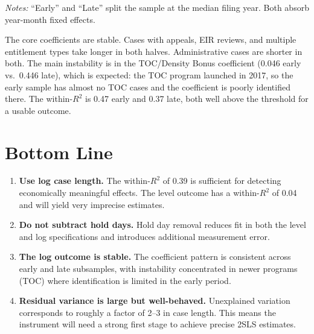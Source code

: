\documentclass[12pt]{article}
\theoremstyle{definition}
\begin{document}
\begin{table}[H]
\centering
\caption{Split-Sample Stability: Log Case Length}
\label{tab:split}

\begin{tablenotes}[flushleft]\small
\item \textit{Notes:} ``Early'' and ``Late'' split the sample at the median filing year. Both absorb year-month fixed effects.
\end{tablenotes}
\end{table}

The core coefficients are stable. Cases with appeals, EIR reviews, and multiple entitlement types take longer in both halves. Administrative cases are shorter in both. The main instability is in the TOC/Density Bonus coefficient (0.046 early vs.\ 0.446 late), which is expected: the TOC program launched in 2017, so the early sample has almost no TOC cases and the coefficient is poorly identified there. The within-$R^2$ is 0.47 early and 0.37 late, both well above the threshold for a usable outcome.

\section{Bottom Line}

\begin{enumerate}
    \item \textbf{Use log case length.} The within-$R^2$ of 0.39 is sufficient for detecting economically meaningful effects. The level outcome has a within-$R^2$ of 0.04 and will yield very imprecise estimates.
    \item \textbf{Do not subtract hold days.} Hold day removal reduces fit in both the level and log specifications and introduces additional measurement error.
    \item \textbf{The log outcome is stable.} The coefficient pattern is consistent across early and late subsamples, with instability concentrated in newer programs (TOC) where identification is limited in the early period.
    \item \textbf{Residual variance is large but well-behaved.} Unexplained variation corresponds to roughly a factor of 2--3 in case length. This means the instrument will need a strong first stage to achieve precise 2SLS estimates.
\end{enumerate}
\end{document}
